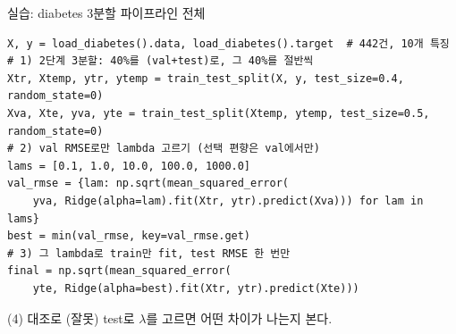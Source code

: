 \documentclass[aspectratio=169,11pt]{beamer}
\begin{document}

\begin{frame}[fragile]{실습: diabetes 3분할 파이프라인 전체}
  \small
\begin{lstlisting}
X, y = load_diabetes().data, load_diabetes().target  # 442건, 10개 특징
# 1) 2단계 3분할: 40%를 (val+test)로, 그 40%를 절반씩
Xtr, Xtemp, ytr, ytemp = train_test_split(X, y, test_size=0.4, random_state=0)
Xva, Xte, yva, yte = train_test_split(Xtemp, ytemp, test_size=0.5, random_state=0)
# 2) val RMSE로만 lambda 고르기 (선택 편향은 val에서만)
lams = [0.1, 1.0, 10.0, 100.0, 1000.0]
val_rmse = {lam: np.sqrt(mean_squared_error(
    yva, Ridge(alpha=lam).fit(Xtr, ytr).predict(Xva))) for lam in lams}
best = min(val_rmse, key=val_rmse.get)
# 3) 그 lambda로 train만 fit, test RMSE 한 번만
final = np.sqrt(mean_squared_error(
    yte, Ridge(alpha=best).fit(Xtr, ytr).predict(Xte)))
\end{lstlisting}
  (4) 대조로 (잘못) test로 $\lambda$를 고르면 어떤 차이가 나는지 본다.
\end{frame}
\end{document}
